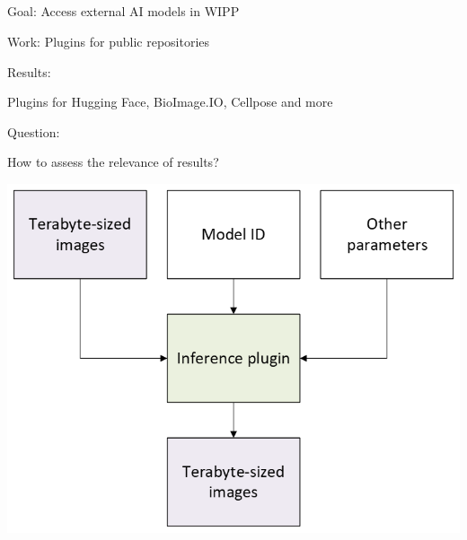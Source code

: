 \subsection{\slidetitle}
\begin{frame}
  \frametitle{\sectiontitle}
  \framesubtitle{\slidetitle}

  \begin{minipage}[h!]{0.53\textwidth}
    Goal: Access external AI models in WIPP

    Work: Plugins for public repositories

    \bigskip

    Results:

    Plugins for Hugging Face, BioImage.IO, Cellpose and more

    \bigskip

    Question:

    How to assess the relevance of results?

  \end{minipage}\hfill
  \begin{minipage}[h!]{0.46\textwidth}
    \includegraphics[scale=0.55]{./img/3_inference.png}
  \end{minipage}
\end{frame}

\def\slidetitle{Evaluate results}

